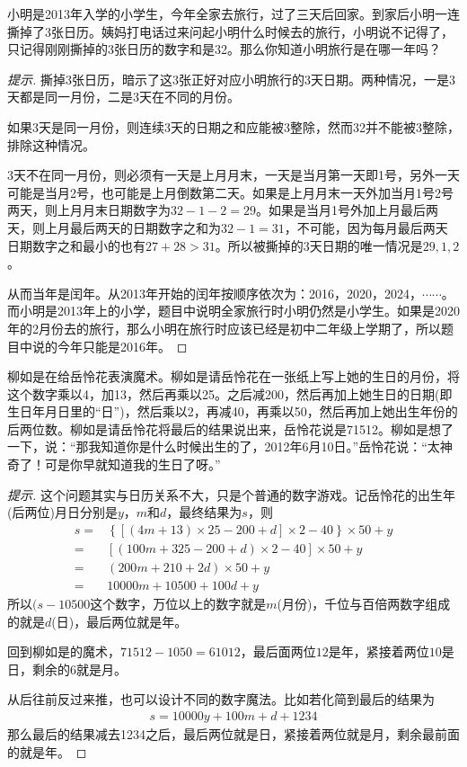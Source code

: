 \begin{example}
  小明是2013年入学的小学生，今年全家去旅行，过了三天后回家。到家后小明一连撕掉了3张日历。姨妈打电话过来问起小明什么时候去的旅行，小明说不记得了，只记得刚刚撕掉的3张日历的数字和是32。那么你知道小明旅行是在哪一年吗？
\end{example}
\begin{proof}[提示]
  撕掉3张日历，暗示了这3张正好对应小明旅行的3天日期。两种情况，一是3天都是同一月份，二是3天在不同的月份。

  如果3天是同一月份，则连续3天的日期之和应能被3整除，然而32并不能被3整除，排除这种情况。

  3天不在同一月份，则必须有一天是上月月末，一天是当月第一天即1号，另外一天可能是当月2号，也可能是上月倒数第二天。如果是上月月末一天外加当月1号2号两天，则上月月末日期数字为$32-1-2=29$。如果是当月1号外加上月最后两天，则上月最后两天的日期数字之和为$32-1=31$，不可能，因为每月最后两天日期数字之和最小的也有$27+28>31$。所以被撕掉的3天日期的唯一情况是$29,1,2$。

  从而当年是闰年。从2013年开始的闰年按顺序依次为：2016，2020，2024，$\cdots\cdots$。而小明是2013年上的小学，题目中说明全家旅行时小明仍然是小学生。如果是2020年的2月份去的旅行，那么小明在旅行时应该已经是初中二年级上学期了，所以题目中说的今年只能是2016年。
\end{proof}

\begin{example}
  柳如是在给岳怜花表演魔术。柳如是请岳怜花在一张纸上写上她的生日的月份，将这个数字乘以4，加13，然后再乘以25。之后减200，然后再加上她生日的日期(即生日年月日里的“日”)，然后乘以2，再减40，再乘以50，然后再加上她出生年份的后两位数。柳如是请岳怜花将最后的结果说出来，岳怜花说是71512。柳如是想了一下，说：“那我知道你是什么时候出生的了，2012年6月10日。”岳怜花说：“太神奇了！可是你早就知道我的生日了呀。”
\end{example}
\begin{proof}[提示]
  这个问题其实与日历关系不大，只是个普通的数字游戏。记岳怜花的出生年(后两位)月日分别是$y$，$m$和$d$，最终结果为$s$，则
  \begin{align*}
    s ={}& \left\{ \left[ (4m + 13)\times 25 - 200 + d \right]\times 2 - 40 \right\} \times 50 + y \\
      ={}&       \left[ (100m + 325 - 200 + d) \times 2 - 40 \right] \times 50 + y\\
      ={}& (200m + 210 + 2d) \times 50 + y\\
      ={}& 10000m + 10500 + 100d + y
  \end{align*}
  所以$(s - 10500$这个数字，万位以上的数字就是$m$(月份)，千位与百倍两数字组成的就是$d$(日)，最后两位就是年。

  回到柳如是的魔术，$71512 - 1050 = 61012$，最后面两位$12$是年，紧接着两位$10$是日，剩余的$6$就是月。

  从后往前反过来推，也可以设计不同的数字魔法。比如若化简到最后的结果为
  \begin{align*}
    s = 10000y + 100m + d + 1234
  \end{align*}
  那么最后的结果减去1234之后，最后两位就是日，紧接着两位就是月，剩余最前面的就是年。
\end{proof}



